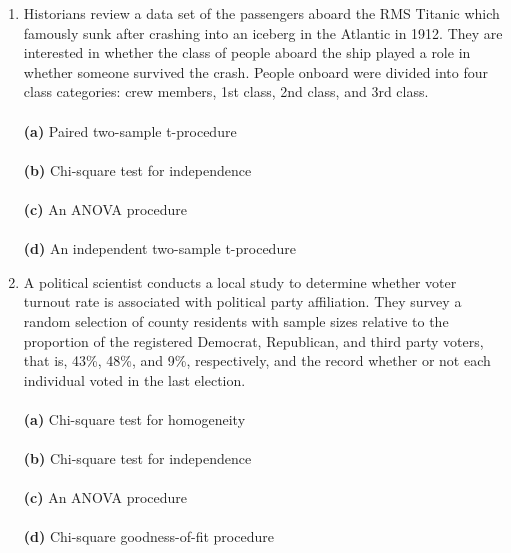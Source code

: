 \documentclass[12pt]{article}
\begin{document}
\begin{enumerate}[leftmargin=\labelsep]
\item  Historians review a data set of the passengers aboard the RMS Titanic which famously sunk after crashing into an iceberg in the Atlantic in 1912. They are interested in whether the class of people aboard the ship played a role in whether someone survived the crash. People onboard were divided into four class categories: crew members, 1st class, 2nd class, and 3rd class.\\ \vspace{1mm}\\
{\bf (a)} \hspace{2mm} Paired two-sample t-procedure\\ \vspace{1mm}\\
{\bf (b)} \hspace{2mm} Chi-square test for independence\\   \vspace{1mm}\\
{\bf (c)} \hspace{2mm} An ANOVA procedure\\  \vspace{1mm}\\
{\bf (d)} \hspace{2mm} An independent two-sample t-procedure\\

\item A political scientist conducts a local study to determine whether voter turnout rate is associated with political party affiliation. They survey a random selection of county residents with sample sizes relative to the proportion of the registered Democrat, Republican, and third party voters, that is, 43\%, 48\%, and 9\%, respectively, and the record whether or not each individual voted in the last election.\\ \vspace{1mm}\\
{\bf (a)} \hspace{2mm} Chi-square test for homogeneity\\ \vspace{1mm}\\
{\bf (b)} \hspace{2mm} Chi-square test for independence\\   \vspace{1mm}\\
{\bf (c)} \hspace{2mm} An ANOVA procedure\\  \vspace{1mm}\\
{\bf (d)} \hspace{2mm} Chi-square goodness-of-fit procedure\\


\end{enumerate}
\end{document}
